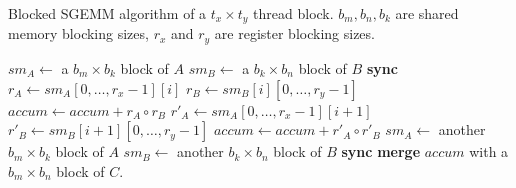 \begin{algorithm}
  \caption{Blocked SGEMM algorithm of a $t_x \times t_y$ thread block. $b_m, b_n, b_k$ are shared memory blocking sizes, $r_x$ and $r_y$ are register blocking sizes.}
  \label{gemm}
  {\footnotesize
  \begin{algorithmic}[1]
	\State $sm_A \gets$ a $b_m \times b_k$ block of $A$
	\State $sm_B \gets$ a $b_k \times b_n$ block of $B$
	\State \textbf{sync}
	\Do
    \State $r_A \gets sm_A[0, \dots, r_x-1][i]$
		\State $r_B \gets sm_B[i][0, \dots, r_y-1]$
		\State $accum \gets accum + r_A \circ r_B$
		\State $r'_A \gets sm_A[0, \dots, r_x-1][i+1]$
		\State $r'_B \gets sm_B[i+1][0, \dots, r_y-1]$
		\State $accum \gets accum + r'_A \circ r'_B$
	\EndFor
	\State $sm_A \gets$ another $b_m \times b_k$ block of $A$
	\State $sm_B \gets$ another $b_k \times b_n$ block of $B$
	\State \textbf{sync}
	\State \textbf{merge} $accum$ with a $b_m \times b_n$ block of $C$.
  \end{algorithmic}
  }
\end{algorithm}


